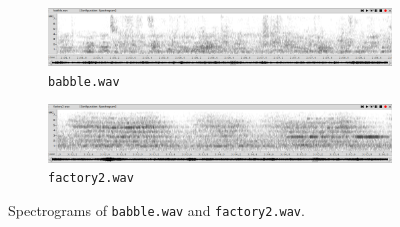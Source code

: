 \documentclass[11pt,a4paper]{report}
\begin{document}
\begin{figure}[htbp]
  \centering
  \begin{subfigure}{0.7\textwidth}
    \includegraphics[width=\textwidth]{babble-spectrogram}
    \caption{\texttt{babble.wav}}
    \label{fig:babble-spectrogram}
  \end{subfigure}

  \begin{subfigure}{0.7\textwidth}
    \includegraphics[width=\textwidth]{factory2-spectrogram}
    \caption{\texttt{factory2.wav}}
    \label{fig:factory2-spectrogram}
  \end{subfigure}

  \caption{Spectrograms of \texttt{babble.wav} and \texttt{factory2.wav}.} \label{fig:noise-spectrogram}
\end{figure}
\end{document}

